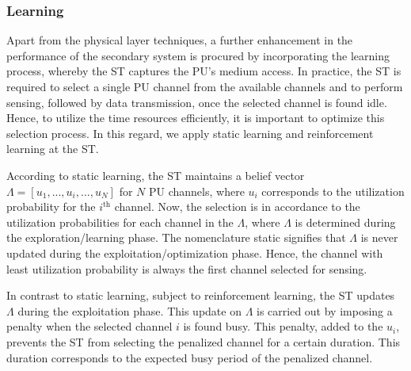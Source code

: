 \documentclass[conference, twocolumn]{IEEEtran}
\begin{document}
\subsubsection{Learning}
Apart from the physical layer techniques, a further enhancement in the performance of the secondary system is procured by incorporating the learning process, whereby the ST captures the PU's medium access. In practice, the ST is required to select a single PU channel from the available channels and to perform sensing, followed by data transmission, once the selected channel is found idle. Hence, to utilize the time resources efficiently, it is important to optimize this selection process. In this regard, we apply static learning and reinforcement learning at the ST. 

According to static learning, the ST maintains a belief vector \cite{Zhao} $\Lambda = [u_1,..., u_i,...,u_N]$ for $N$ PU channels, where $u_i$ corresponds to the utilization probability for the $i^{\text{th}}$ channel. Now, the selection is in accordance to the utilization probabilities for each channel in the $\Lambda$, where $\Lambda$ is determined during the exploration/learning phase. The nomenclature static signifies that $\Lambda$ is never updated during the exploitation/optimization phase. Hence, the channel with least utilization probability is always the first channel selected for sensing. 

In contrast to static learning, subject to reinforcement learning, the ST updates $\Lambda$ during the exploitation phase. This update on $\Lambda$ is carried out by imposing a penalty when the selected channel $i$ is found busy. This penalty, added to the $u_i$, prevents the ST from selecting the penalized channel for a certain duration. This duration corresponds to the expected busy period of the penalized channel. %


\end{document}
